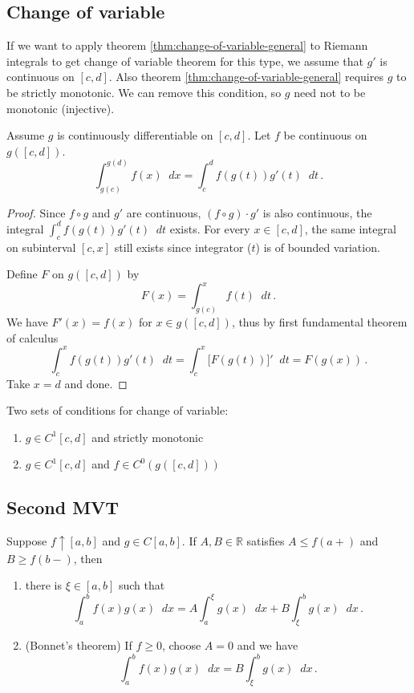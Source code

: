 \documentclass{article}
\newcommand{\R}{\mathbb R}
\newcommand{\dd}{\mathop{}\!d}
\newcommand{\increasing}{\uparrow}
\begin{document}
\subsection{Change of variable}
If we want to apply theorem \ref{thm:change-of-variable-general} to Riemann integrals to get change of variable theorem for this type, we assume that $ g' $ is continuous on $ [c, d] $. Also theorem \ref{thm:change-of-variable-general} requires $ g $ to be strictly monotonic. We can remove this condition, so $ g $ need not to be monotonic (injective).

\begin{theorem}
    Assume $ g $ is continuously differentiable on $ [c, d] $. Let $ f $ be continuous on $ g([c, d]) $. 
    \[ 
        \int_{g(c)}^{g(d)} f(x) \dd x = \int_c^d f(g(t)) g'(t) \dd t \,.
    \]
\end{theorem}

\begin{proof}
    Since $ f \circ g $ and $ g' $ are continuous, $ (f \circ g) \cdot g' $ is also continuous, the integral $ \int_c^d f(g(t)) g'(t) \dd t $ exists. For every $ x \in [c, d] $, the same integral on subinterval $ [c, x] $ still exists since integrator ($ t $) is of bounded variation.

    Define $ F $ on $ g([c, d]) $ by
    \[ 
        F(x) = \int_{g(c)}^{x} f(t) \dd t \,.
    \]
    We have $ F'(x) = f(x) $ for $ x \in g([c, d]) $, thus by first fundamental theorem of calculus
    \[ 
        \int_c^x f(g(t)) g'(t) \dd t = \int_c^x \big[ F(g(t)) \big]' \dd t = F(g(x)) \,.
    \]
    Take $ x = d $ and done.
\end{proof}

Two sets of conditions for change of variable:
\begin{enumerate}
    \item $ g \in C^1[c, d] $ and strictly monotonic
    \item $ g \in C^1[c, d] $ and $ f \in C^0(g([c, d])) $
\end{enumerate}


\subsection{Second MVT}
\begin{theorem}
    Suppose $ f \increasing [a, b] $ and $ g \in C[a, b] $. If $ A, B \in \R $ satisfies $ A \leqslant f(a+) $ and $ B \geqslant f(b-) $, then 
    \begin{enumerate}
        \item there is $ \xi \in [a, b] $ such that
        \[ 
            \int_a^b f(x) g(x) \dd x = A \int_a^\xi g(x) \dd x + B \int_\xi^b g(x) \dd x \,.
        \]
        \item (Bonnet's theorem) If $ f \geqslant 0 $, choose $ A = 0 $ and we have
        \[ 
            \int_a^b f(x) g(x) \dd x = B \int_\xi^b g(x) \dd x \,.
        \]
    \end{enumerate}
\end{theorem}
\end{document}
